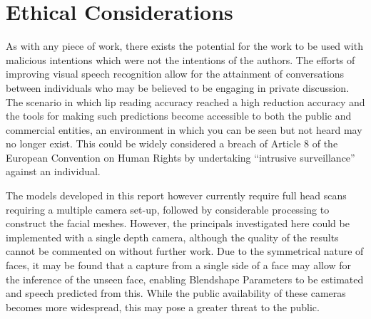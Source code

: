 \chapter*{Ethical Considerations}

As with any piece of work, there exists the potential for the work to be used with malicious intentions which were not the intentions of the authors.
The efforts of improving visual speech recognition allow for the attainment of conversations between individuals who may be believed to be engaging in private discussion.
The scenario in which lip reading accuracy reached a high reduction accuracy and the tools for making such predictions become accessible to both the public and commercial entities, an environment in which you can be seen but not heard may no longer exist.
This could be widely considered a breach of Article 8 of the European Convention on Human Rights \cite{EuropeanConventiononHumanRights} by undertaking ``intrusive surveillance'' against an individual.

The models developed in this report however currently require full head scans requiring a multiple camera set-up, followed by considerable processing to construct the facial meshes.
However, the principals investigated here could be implemented with a single depth camera, although the quality of the results cannot be commented on without further work.
Due to the symmetrical nature of faces, it may be found that a capture from a single side of a face may allow for the inference of the unseen face, enabling Blendshape Parameters to be estimated and speech predicted from this.
While the public availability of these cameras becomes more widespread, this may pose a greater threat to the public.

